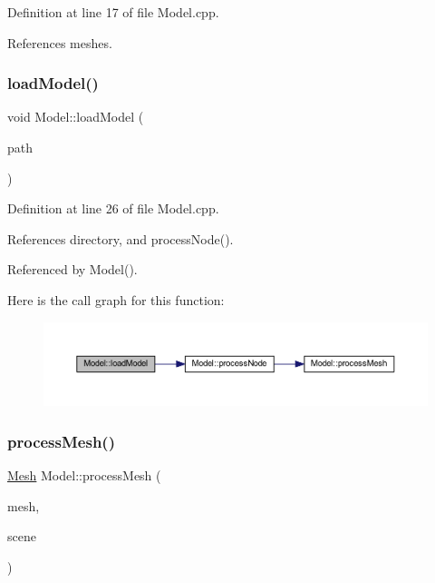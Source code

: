Definition at line 17 of file Model.\+cpp.



References meshes.

\mbox{\label{classModel_a3cd88224a93dc81a8503d42be807eb86}} 
\subsubsection{\texorpdfstring{load\+Model()}{loadModel()}}
{\footnotesize\ttfamily void Model\+::load\+Model (\begin{DoxyParamCaption}\item[{std\+::string}]{path }\end{DoxyParamCaption})\hspace{0.3cm}{\ttfamily [private]}}



Definition at line 26 of file Model.\+cpp.



References directory, and process\+Node().



Referenced by Model().

Here is the call graph for this function\+:
\nopagebreak
\begin{figure}[H]
\begin{center}
\leavevmode
\includegraphics[width=350pt]{classModel_a3cd88224a93dc81a8503d42be807eb86_cgraph}
\end{center}
\end{figure}
\mbox{\label{classModel_a95ae1a9980ded3d98b1c8785cb889d96}} 
\subsubsection{\texorpdfstring{process\+Mesh()}{processMesh()}}
{\footnotesize\ttfamily \mbox{\hyperlink{classMesh}{Mesh}} Model\+::process\+Mesh (\begin{DoxyParamCaption}\item[{ai\+Mesh $\ast$}]{mesh,  }\item[{const ai\+Scene $\ast$}]{scene }\end{DoxyParamCaption})\hspace{0.3cm}{\ttfamily [private]}}



